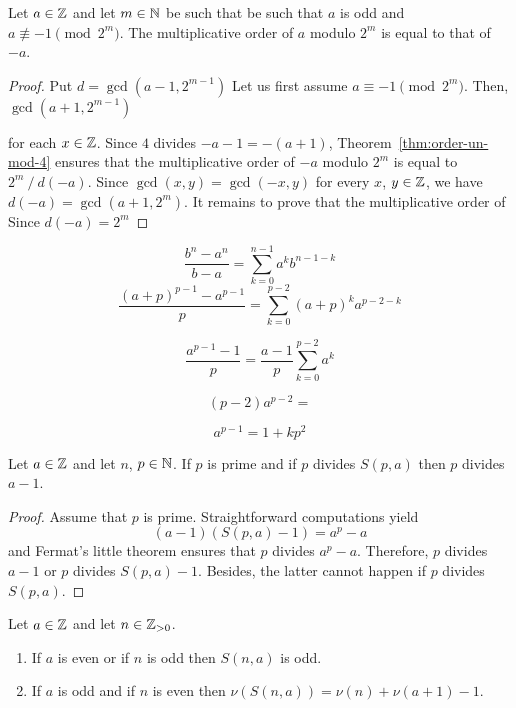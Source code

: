 \begin{theorem} \label{thm:order-trois-mod-4}
  Let $a \in \mathbb{Z}$ and let $m \in \mathbb{N}$ be such that be such that $a$ is odd and $a \not\equiv -1 \pmod{2^m}$.
  The multiplicative order of $a$ modulo $2^m$ is equal to that of $- a$.
\end{theorem}





\begin{proof}
  Put $d = \gcd(a - 1, 2^{m - 1})$
  Let us first assume $a \equiv - 1 \pmod{2^m}$.  
  Then, $\gcd(a + 1, 2^{m - 1}) $

   for each $x \in \mathbb{Z}$.
  Since $4$ divides $- a - 1 = - (a + 1)$,
  Theorem~\ref{thm:order-un-mod-4} ensures that the multiplicative order of $- a$ modulo $2^m$ is equal to
  $2^m \mathbin{/} d(- a)$.
  Since $\gcd(x, y) = \gcd(- x, y)$ for every $x$, $y \in \mathbb{Z}$, we have $d(- a) = \gcd(a + 1, 2^m)$.
  It remains to prove that the multiplicative order of
  Since  $d(- a) = 2^m$ 
\end{proof}

$$
\frac{b^n - a^n}{b - a} =  \sum_{k = 0}^{n - 1}a^k b^{n - 1 - k} 
$$
$$
\frac{{(a + p)}^{p - 1} - a^{p - 1}}{p}  =  \sum_{k = 0}^{p - 2} {(a +  p)}^k a^{p - 2 - k}
$$

$$
\frac{a^{p - 1} - 1}{p} = \frac{a - 1}{p} \sum_{k = 0}^{p - 2} a^k 
$$

$$
(p - 2) a^{p - 2} = 
$$

$$
a^{p - 1}  = 1 + k p^2 
$$

\begin{theorem}
  Let $a \in \mathbb{Z}$ and let $n$, $p \in \mathbb{N}$.
  If $p$ is prime and if $p$ divides $S(p, a)$ then $p$ divides $a - 1$.
  \end{theorem}

  \begin{proof}
  Assume that $p$ is prime.
  Straightforward computations yield
  $$(a - 1) (S(p, a) - 1) = a^p - a$$
  and
  Fermat's little theorem ensures that $p$ divides $a^p - a$.
  Therefore, $p$ divides $a - 1$ or $p$ divides $S(p, a) - 1$.
  Besides, the latter cannot happen if $p$ divides $S(p, a)$.
\end{proof}


\begin{theorem}
  Let $a \in \mathbb{Z}$ and let $n \in \mathbb{Z}_{> 0}$.
  \begin{enumerate}
  \item If $a$ is even or if $n$ is odd then $S(n, a)$ is odd.
  \item If $a$ is odd and if $n$ is even then $\nu(S(n, a)) = \nu(n) + \nu(a + 1) - 1$.
  \end{enumerate}
\end{theorem}

